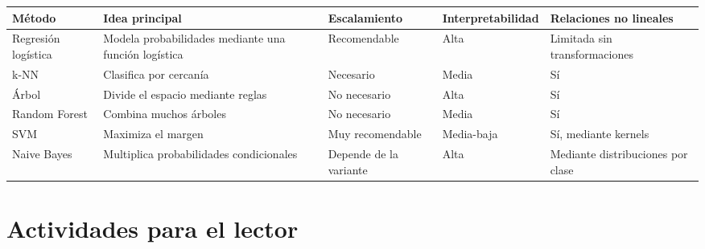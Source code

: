 \documentclass[
  spanish,
  10.5pt,
  letterpaper,
  openany,
  headings=big]{scrbook}
\newcounter{none} %
\begin{document}
{\def\LTcaptype{none} %
\begin{longtable}[]{@{}
  >{\raggedright\arraybackslash}p{}
  >{\raggedright\arraybackslash}p{}
  >{\raggedleft\arraybackslash}p{}
  >{\raggedleft\arraybackslash}p{}
  >{\raggedleft\arraybackslash}p{}@{}}
\toprule\noalign{}
\begin{minipage}[b]{\linewidth}\raggedright
Método
\end{minipage} & \begin{minipage}[b]{\linewidth}\raggedright
Idea principal
\end{minipage} & \begin{minipage}[b]{\linewidth}\raggedleft
Escalamiento
\end{minipage} & \begin{minipage}[b]{\linewidth}\raggedleft
Interpretabilidad
\end{minipage} & \begin{minipage}[b]{\linewidth}\raggedleft
Relaciones no lineales
\end{minipage} \\
\midrule\noalign{}
\endhead
\bottomrule\noalign{}
\endlastfoot
Regresión logística & Modela probabilidades mediante una función
logística & Recomendable & Alta & Limitada sin transformaciones \\
k-NN & Clasifica por cercanía & Necesario & Media & Sí \\
Árbol & Divide el espacio mediante reglas & No necesario & Alta & Sí \\
Random Forest & Combina muchos árboles & No necesario & Media & Sí \\
SVM & Maximiza el margen & Muy recomendable & Media-baja & Sí, mediante
kernels \\
Naive Bayes & Multiplica probabilidades condicionales & Depende de la
variante & Alta & Mediante distribuciones por clase \\
\end{longtable}
}

\section{Actividades para el lector}\label{actividades-para-el-lector-2}
\end{document}
